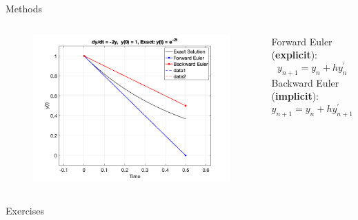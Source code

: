 \documentclass[xcolor={dvipsnames,rgb}, aspectratio=169]{beamer}
\begin{document}
\begin{frame}{Methods}
   \begin{columns}
         \begin{figure}
            \centering
            \includegraphics[width=1.2\textwidth]{figures/expVSimp.png}
         \end{figure}
         \centering
         Forward Euler (\textbf{explicit}):
         \begin{equation*}
            y_{n+1} = y_{n} + hy_{n}^{'}
         \end{equation*}
         \centering
         Backward Euler (\textbf{implicit}):
         \begin{equation*}
            y_{n+1} = y_{n} + hy_{n+1}^{'}
         \end{equation*}
   \end{columns}
\end{frame}

{%
   \begin{frame}[standout]
	   Exercises
   \end{frame}
}
\end{document}
